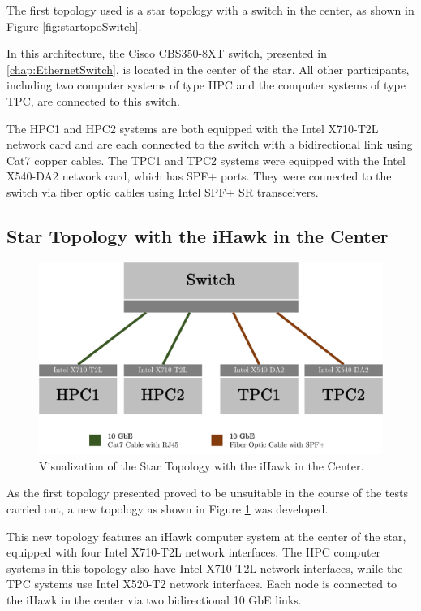 The first topology used is a star topology with a switch in the center, as shown in Figure \ref{fig:startopoSwitch}.

In this architecture, the Cisco CBS350-8XT switch, presented in \ref{chap:EthernetSwitch}, is located in the center of the star. All other participants, including two computer systems of type HPC and the computer systems of type TPC, are connected to this switch.

The HPC1 and HPC2 systems are both equipped with the Intel X710-T2L network card and are each connected to the switch with a bidirectional link using Cat7 copper cables. The TPC1 and TPC2 systems were equipped with the Intel X540-DA2 network card, which has SPF+ ports. They were connected to the switch via fiber optic cables using Intel SPF+ SR transceivers.

\subsection{Star Topology with the iHawk in the Center} \label{chap:TopoiHawk}

\begin{figure}[h!]
    \centering
    \includegraphics[width=1\linewidth]{figures/method/topo3.pdf}
    \caption[Visualization of the Star Topology with the iHawk in the Center]{Visualization of the Star Topology with the iHawk in the Center.}
    \label{fig:startopoIHawk}
\end{figure}

As the first topology presented proved to be unsuitable in the course of the tests carried out, a new topology as shown in Figure \ref{fig:startopoIHawk} was developed.

This new topology features an iHawk computer system at the center of the star, equipped with four Intel X710-T2L network interfaces. The HPC computer systems in this topology also have Intel X710-T2L network interfaces, while the TPC systems use Intel X520-T2 network interfaces. Each node is connected to the iHawk in the center via two bidirectional 10 GbE links.


